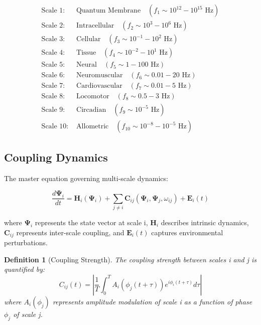 \documentclass[12pt,twocolumn]{article}
\newtheorem{definition}{Definition}
\begin{document}
\begin{align}
\text{Scale 1: } &\text{Quantum Membrane} \quad (f_1 \sim 10^{12}-10^{15} \text{ Hz}) \nonumber \\
\text{Scale 2: } &\text{Intracellular} \quad (f_2 \sim 10^3-10^6 \text{ Hz}) \nonumber \\
\text{Scale 3: } &\text{Cellular} \quad (f_3 \sim 10^{-1}-10^2 \text{ Hz}) \nonumber \\
\text{Scale 4: } &\text{Tissue} \quad (f_4 \sim 10^{-2}-10^1 \text{ Hz}) \nonumber \\
\text{Scale 5: } &\text{Neural} \quad (f_5 \sim 1-100 \text{ Hz}) \nonumber \\
\text{Scale 6: } &\text{Neuromuscular} \quad (f_6 \sim 0.01-20 \text{ Hz}) \nonumber \\
\text{Scale 7: } &\text{Cardiovascular} \quad (f_7 \sim 0.01-5 \text{ Hz}) \nonumber \\
\text{Scale 8: } &\text{Locomotor} \quad (f_8 \sim 0.5-3 \text{ Hz}) \nonumber \\
\text{Scale 9: } &\text{Circadian} \quad (f_9 \sim 10^{-5} \text{ Hz}) \nonumber \\
\text{Scale 10: } &\text{Allometric} \quad (f_{10} \sim 10^{-8}-10^{-5} \text{ Hz})
\end{align}

\subsection{Coupling Dynamics}

The master equation governing multi-scale dynamics:

\begin{equation}
\frac{d\mathbf{\Psi}_i}{dt} = \mathbf{H}_i(\mathbf{\Psi}_i) + \sum_{j \neq i} \mathbf{C}_{ij}(\mathbf{\Psi}_i, \mathbf{\Psi}_j, \omega_{ij}) + \mathbf{E}_i(t)
\label{eq:master}
\end{equation}

where $\mathbf{\Psi}_i$ represents the state vector at scale i, $\mathbf{H}_i$ describes intrinsic dynamics, $\mathbf{C}_{ij}$ represents inter-scale coupling, and $\mathbf{E}_i(t)$ captures environmental perturbations.

\begin{definition}[Coupling Strength]
The coupling strength between scales i and j is quantified by:
\begin{equation}
C_{ij}(t) = \left|\frac{1}{T} \int_0^T A_i(\phi_j(t+\tau)) e^{i\phi_i(t+\tau)} d\tau\right|
\end{equation}
where $A_i(\phi_j)$ represents amplitude modulation of scale i as a function of phase $\phi_j$ of scale j.
\end{definition}
\end{document}
